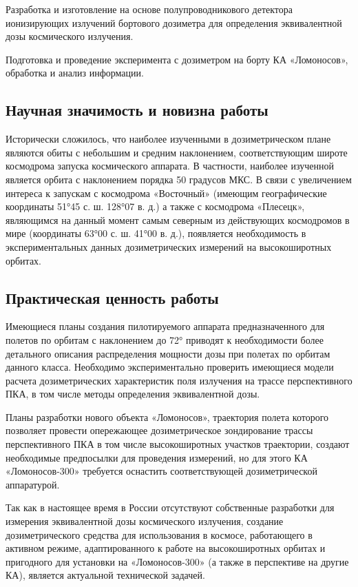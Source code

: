 \documentclass[a4paper,portrait,12pt]{article}
\begin{document}
{{{{Разработка и изготовление на основе полупроводникового детектора ионизирующих излучений бортового дозиметра для определения эквивалентной дозы космического излучения.


Подготовка и проведение эксперимента с дозиметром на борту КА «Ломоносов», обработка и анализ информации.








\subsection*{\textbf{Научная значимость и новизна работы}}

Исторически сложилось, что наиболее изученными в дозиметрическом плане являются обиты с небольшим и средним наклонением, соответствующим широте космодрома запуска космического аппарата. В частности, наиболее изученной является орбита с наклонением порядка 50 градусов МКС. В связи с увеличением интереса к запускам с космодрома «Восточный» (имеющим географические координаты 51°45 с. ш. 128°07 в. д.) а также с космодрома «Плесецк», являющимся на данный момент самым северным из действующих космодромов в мире (координаты 63°00 с. ш. 41°00 в. д.), появляется необходимость в экспериментальных данных дозиметрических измерений на высокоширотных орбитах. 


\subsection*{\textbf{Практическая ценность работы}}

Имеющиеся планы создания пилотируемого аппарата предназначенного для полетов по орбитам с наклонением до 72° приводят к необходимости более детального описания распределения мощности дозы при полетах по орбитам данного класса. Необходимо экспериментально проверить имеющиеся модели расчета дозиметрических характеристик поля излучения на трассе перспективного ПКА, в том числе методы определения эквивалентной дозы.


Планы разработки нового объекта «Ломоносов», траектория полета которого позволяет провести опережающее дозиметрическое зондирование трассы перспективного ПКА в том числе высокоширотных участков траектории, создают необходимые предпосылки для проведения измерений, но для этого КА «Ломоносов-300» требуется оснастить соответствующей дозиметрической аппаратурой.


Так как в настоящее время в России отсутствуют собственные разработки для измерения эквивалентной дозы космического излучения, создание дозиметрического средства для использования в космосе, работающего в активном режиме, адаптированного к работе на высокоширотных орбитах и пригодного для установки на «Ломоносов-300» (а также в перспективе на другие КА), является актуальной технической задачей.


}}}}
\end{document}
